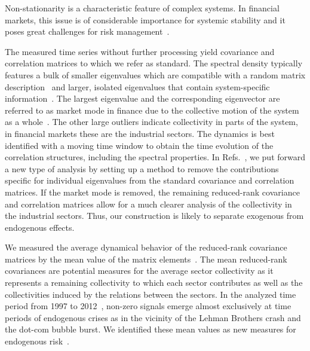 \documentclass[aps, pra, groupedaddress, showkeys, twocolumn, floatfix, 10pt]{revtex4-2}
\begin{document}
Non-stationarity is a characteristic feature of complex systems.  In
financial markets, this issue is of considerable importance for systemic
stability and it poses great challenges for risk
management~\cite{Mandelbrot1997,schwert1989does,LONGIN19953,mantegna1999introduction,bouchaud2003theory,Kwapien_2012,Kutner_2019}.

The measured time series without further processing yield covariance
and correlation matrices to which we refer as standard. The spectral
density typically features a bulk of smaller eigenvalues which are
compatible with a random matrix description~\cite{Marchenko_1967,Kwapien_2006} and
larger, isolated eigenvalues that contain system-specific
information~\cite{Laloux_1999,
	Noh_2000, Gopikrishnan_2001, Plerou_2002, Song_2011,
	MacMahon_2015,Stepanov_2015,Chetalova_2015,Benzaquen_2017,potters2020first}. The largest eigenvalue and the corresponding eigenvector are referred to as market mode in finance due to the collective motion of the system as a whole~\cite{MacMahon_2015,Allez_2012,Reigneron_2011}.  The other large outliers indicate collectivity in parts
of the system, in financial markets these are the industrial
sectors.
The dynamics is best identified with a moving time window to
obtain the time evolution of the correlation structures, including the
spectral properties. In Refs.~\cite{Heckens_2020,Heckens_2022}, we
put forward a new type of analysis by setting up a method to remove
the contributions specific for individual eigenvalues from the
standard covariance and correlation matrices. If the market mode
is removed, the remaining reduced-rank covariance
and correlation matrices allow for a much clearer analysis of the collectivity
in the industrial sectors.
Thus, our construction is likely to separate exogenous from endogenous effects.

We measured the average dynamical behavior of the reduced-rank
covariance matrices by the mean value of the matrix
elements~\cite{Heckens_2022}. The mean
reduced-rank covariances are potential measures for the average sector collectivity
as it represents a remaining collectivity to which each sector contributes as well as the collectivities induced by the relations between the sectors.  In
the analyzed time period from 1997 to 2012~\cite{Heckens_2022},
non-zero signals  emerge almost exclusively at time periods of endogenous
crises as in the vicinity of the Lehman Brothers crash and the dot-com
bubble burst. We identified these mean values as new measures for
endogenous
risk~\cite{sornette2003causes,bouchaud2010endogenous,Danielsson_2012,Bouchaud_2011}.
\end{document}
